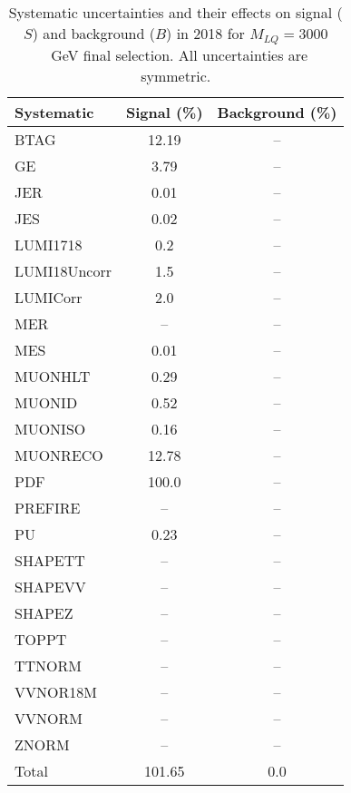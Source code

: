 \begin{table}[htbp]
\begin{center}
\caption{Systematic uncertainties and their effects on signal ($S$) and background ($B$) in 2018 for $M_{LQ}=3000$~GeV final selection. All uncertainties are symmetric.}
\begin{tabular}{lcc}
\hline\hline
Systematic & Signal (\%) & Background (\%) \\ \hline 
BTAG & 12.19 & --\\ 
GE & 3.79 & --\\ 
JER & 0.01 & --\\ 
JES & 0.02 & --\\ 
LUMI1718 & 0.2 & --\\ 
LUMI18Uncorr & 1.5 & --\\ 
LUMICorr & 2.0 & --\\ 
MER & -- & --\\ 
MES & 0.01 & --\\ 
MUONHLT & 0.29 & --\\ 
MUONID & 0.52 & --\\ 
MUONISO & 0.16 & --\\ 
MUONRECO & 12.78 & --\\ 
PDF & 100.0 & --\\ 
PREFIRE & -- & --\\ 
PU & 0.23 & --\\ 
SHAPETT & -- & --\\ 
SHAPEVV & -- & --\\ 
SHAPEZ & -- & --\\ 
TOPPT & -- & --\\ 
TTNORM & -- & --\\ 
VVNOR18M & -- & --\\ 
VVNORM & -- & --\\ 
ZNORM & -- & --\\ 
Total & 101.65 & 0.0\\ \hline \hline
\end{tabular}
\label{tab:SysUncertainties_uujj_3000}
\end{center}
\end{table}

